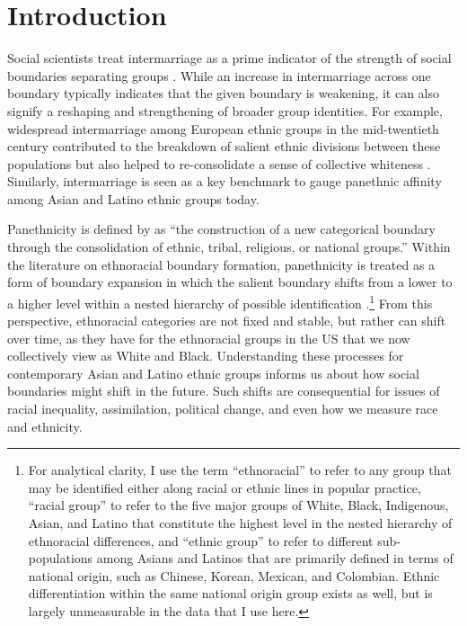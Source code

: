 \documentclass[11pt,]{article}
\newlength{\normalparindent}
\begin{document}
\vskip 6.5pt

\noindent \newpage\doublespacing\raggedright\setlength{\parindent}{\normalparindent} \hypertarget{introduction}{%
\section{Introduction}\label{introduction}}

Social scientists treat intermarriage as a prime indicator of the strength of social boundaries separating groups \citep{gordon_assimilation_1964}. While an increase in intermarriage across one boundary typically indicates that the given boundary is weakening, it can also signify a reshaping and strengthening of broader group identities. For example, widespread intermarriage among European ethnic groups in the mid-twentieth century contributed to the breakdown of salient ethnic divisions between these populations but also helped to re-consolidate a sense of collective whiteness \citep{lieberson_many_1988, alba_ethnic_1990, jacobsen_whiteness_1998}. Similarly, intermarriage is seen as a key benchmark to gauge panethnic affinity among Asian and Latino ethnic groups today.

Panethnicity is defined by \citet{okamoto_panethnicity_2014a} as ``the construction of a new categorical boundary through the consolidation of ethnic, tribal, religious, or national groups.'' Within the literature on ethnoracial boundary formation, panethnicity is treated as a form of boundary expansion in which the salient boundary shifts from a lower to a higher level within a nested hierarchy of possible identification \citep{wimmer_making_2008}.\footnote{For analytical clarity, I use the term ``ethnoracial'' to refer to any group that may be identified either along racial or ethnic lines in popular practice, ``racial group'' to refer to the five major groups of White, Black, Indigenous, Asian, and Latino that constitute the highest level in the nested hierarchy of ethnoracial differences, and ``ethnic group'' to refer to different sub-populations among Asians and Latinos that are primarily defined in terms of national origin, such as Chinese, Korean, Mexican, and Colombian. Ethnic differentiation within the same national origin group exists as well, but is largely unmeasurable in the data that I use here.} From this perspective, ethnoracial categories are not fixed and stable, but rather can shift over time, as they have for the ethnoracial groups in the US that we now collectively view as White and Black. Understanding these processes for contemporary Asian and Latino ethnic groups informs us about how social boundaries might shift in the future. Such shifts are consequential for issues of racial inequality, assimilation, political change, and even how we measure race and ethnicity.
\end{document}
